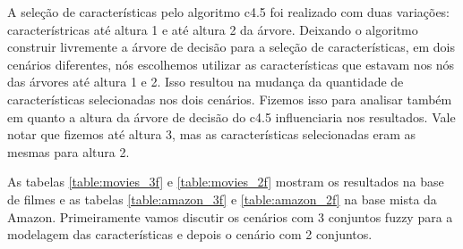 \documentclass[template.tex]{subfiles}
\begin{document}

A seleção de características pelo algoritmo c4.5 foi realizado com duas variações: característricas até altura 1 e até altura 2 da árvore. Deixando o algoritmo construir livremente a árvore de decisão para a seleção de características, em dois cenários diferentes, nós escolhemos utilizar as características que estavam nos nós das árvores até altura 1 e 2. Isso resultou na mudança da quantidade de características selecionadas nos dois cenários. Fizemos isso para analisar também em quanto a altura da árvore de decisão do c4.5 influenciaria nos resultados. Vale notar que fizemos até altura 3, mas as características selecionadas eram as mesmas para altura 2. 

As tabelas \ref{table:movies_3f} e \ref{table:movies_2f} mostram os resultados na base de filmes e as tabelas \ref{table:amazon_3f} e \ref{table:amazon_2f} na base mista da Amazon. Primeiramente vamos discutir os cenários com 3 conjuntos fuzzy para a modelagem das características e depois o cenário com 2 conjuntos.
\end{document}
